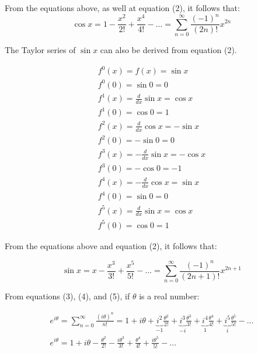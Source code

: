 \documentclass[11pt]{article}
\begin{document}
From the equations above, as well at equation (2), it follows that:
\begin{equation}
    \cos x = 1 - \frac{{{x^2}}}{{2!}} + \frac{{{x^4}}}{{4!}} - ... = \sum\limits_{n = 0}^\infty  {\frac{{{{\left( { - 1} \right)}^n}}}{{\left( {2n} \right)!}}}  {x^{2n}}
\end{equation}

The Taylor series of $\sin x$ can also be derived from equation (2).

\[
\renewcommand{\arraystretch}{1.25} %
\begin{array}{l}
{f^0}\left( x \right) = f\left( x \right) = \sin x\\
{f^0}\left( 0 \right) = \sin 0 = 0\\
{f^1}\left( x \right) = \frac{d}{{dx}}\sin x = \cos x\\
{f^1}\left( 0 \right) = \cos 0 = 1\\
{f^2}\left( x \right) = \frac{d}{{dx}}\cos x =  - \sin x\\
{f^2}\left( 0 \right) =  - \sin 0 = 0\\
{f^3}\left( x \right) =  - \frac{d}{{dx}}\sin x =  - \cos x\\
{f^3}\left( 0 \right) =  - \cos 0 =  - 1\\
{f^4}\left( x \right) =  - \frac{d}{{dx}}\cos x = \sin x\\
{f^4}\left( 0 \right) = \sin 0 = 0\\
{f^5}\left( x \right) = \frac{d}{{dx}}\sin x = \cos x\\
{f^5}\left( 0 \right) = \cos 0 = 1
\end{array}
\]

From the equations above and equation (2), it follows that:

\begin{equation}
    \sin x = x - \frac{{{x^3}}}{{3!}} + \frac{{{x^5}}}{{5!}} - ... = \sum\limits_{n = 0}^\infty  {\frac{{{{\left( { - 1} \right)}^n}}}{{\left( {2n + 1} \right)!}}{x^{2n + 1}}} 
\end{equation}

From equations (3), (4), and (5), if $\theta$ is a real number:

\[
\renewcommand{\arraystretch}{1.25} %
\begin{array}{l}
e^{i\theta} = \sum\limits_{n=0}^{\infty} \frac{(i\theta)^n}{n!}
= 1 + i\theta + \underbrace{i^2}_{-1}\frac{\theta^2}{2!}
+ \underbrace{i^3}_{-i}\frac{\theta^3}{3!}
+ \underbrace{i^4}_{1}\frac{\theta^4}{4!}
+ \underbrace{i^5}_{i}\frac{\theta^5}{5!} - \ldots\\
e^{i\theta} = 1 + i\theta - \frac{\theta^2}{2!} - \frac{i\theta^3}{3!}
+ \frac{\theta^4}{4!} + \frac{i\theta^5}{5!} - \ldots
\end{array}
\]
\end{document}
